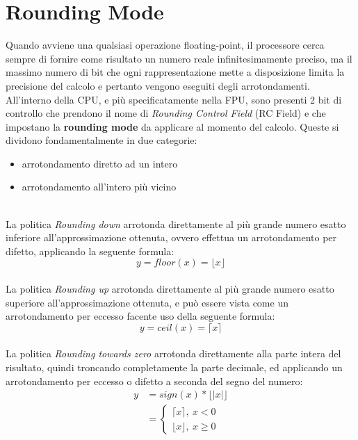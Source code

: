 \documentclass[Lau, oneside]{sapthesis}%
\begin{document}
\newpage
\section{Rounding Mode}
Quando avviene una qualsiasi operazione floating-point, il processore cerca sempre di fornire come risultato un numero reale infinitesimamente preciso, ma il massimo numero di bit che ogni rappresentazione mette a disposizione limita la precisione del calcolo e pertanto vengono eseguiti degli arrotondamenti.
\newline \newline
All'interno della CPU, e più specificatamente nella FPU, sono presenti 2 bit di controllo che prendono il nome di \textit{Rounding Control Field} (RC Field) e che impostano la \textbf{rounding mode} da applicare al momento del calcolo.
\newline \newline
Queste si dividono fondamentalmente in due categorie:
\begin{itemize}
    \item arrotondamento diretto ad un intero
    \item arrotondamento all'intero più vicino
\end{itemize}
\ \\
\newline
La politica \textit{Rounding down} arrotonda direttamente al più grande numero esatto inferiore all'approssimazione ottenuta, ovvero effettua un arrotondamento per difetto, applicando la seguente formula:
\begin{equation}
    y = floor(x) = \lfloor x \rfloor
\end{equation}
\ \\
\newline
La politica \textit{Rounding up} arrotonda direttamente al più grande numero esatto superiore all'approssimazione ottenuta, e può essere vista come un arrotondamento per eccesso facente uso della seguente formula:
\begin{equation}
    y = ceil(x) = \lceil x \rceil
\end{equation}
\ \\
\newline
La politica \textit{Rounding towards zero} arrotonda direttamente alla parte intera del risultato, quindi troncando completamente la parte decimale, ed applicando un arrotondamento per eccesso o difetto a seconda del segno del numero:
\begin{equation}
    \begin{aligned}
        y &= sign(x) * \lfloor |x| \rfloor \\
        &= \begin{cases} \lceil x \rceil, \  x < 0 \\ \lfloor x \rfloor, \  x \geq 0 \end{cases}
    \end{aligned}
\end{equation}
\end{document}
